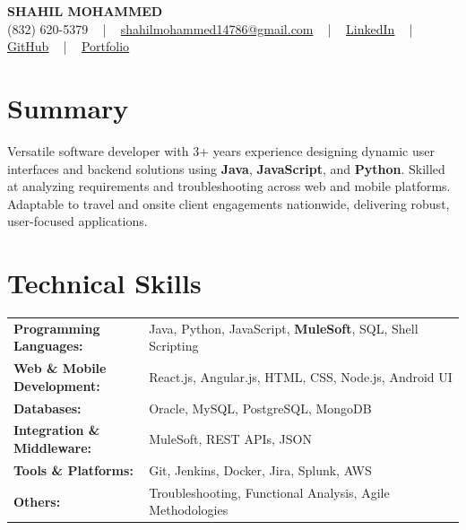 \documentclass[letterpaper,11pt]{article}
\begin{document}
\begin{center}
    {\fontsize{14pt}{12pt}\selectfont \textbf{\MakeUppercase{Shahil Mohammed}}}\\ \vspace{2pt}
    \fontsize{10pt}{12pt}\selectfont (832) 620-5379 ~ | ~ \href{mailto:shahilmohammed14786@gmail.com}{shahilmohammed14786@gmail.com} ~ | ~  
    \href{https://www.linkedin.com/in/shahil-mohammed-9652931a1/}{\color{blue}\underline{LinkedIn}}  ~ | ~ 
    \href{https://github.com/freakbeast14}{\color{blue}\underline{GitHub}} ~ | ~ 
    \href{https://shahil-mohammed.netlify.app/}{\color{blue}\underline{Portfolio}}
    \vspace{-8pt}
\end{center}

\section{Summary}
\fontsize{9pt}{10pt}\selectfont
Versatile software developer with 3+ years experience designing dynamic user interfaces and backend solutions using \textbf{Java}, \textbf{JavaScript}, and \textbf{Python}. Skilled at analyzing requirements and troubleshooting across web and mobile platforms. Adaptable to travel and onsite client engagements nationwide, delivering robust, user-focused applications.
 \vspace{-5pt}
 
\section{Technical Skills}
        \vspace{-14pt}
        \begin{table}[h]
            \fontsize{9pt}{10pt}\selectfont
            \begin{tabular}{p{0.3\linewidth} p{0.7\linewidth}}
                \textbf{Programming Languages:} & Java, Python, JavaScript, \textbf{MuleSoft}, SQL, Shell Scripting \\
                \textbf{Web \& Mobile Development:} & React.js, Angular.js, HTML, CSS, Node.js, Android UI \\
                \textbf{Databases:} & Oracle, MySQL, PostgreSQL, MongoDB \\
                \textbf{Integration \& Middleware:} & MuleSoft, REST APIs, JSON \\
                \textbf{Tools \& Platforms:} & Git, Jenkins, Docker, Jira, Splunk, AWS \\
                \textbf{Others:} & Troubleshooting, Functional Analysis, Agile Methodologies \\
            \end{tabular}
        \end{table}
 \vspace{-15pt}
 
\end{document}
